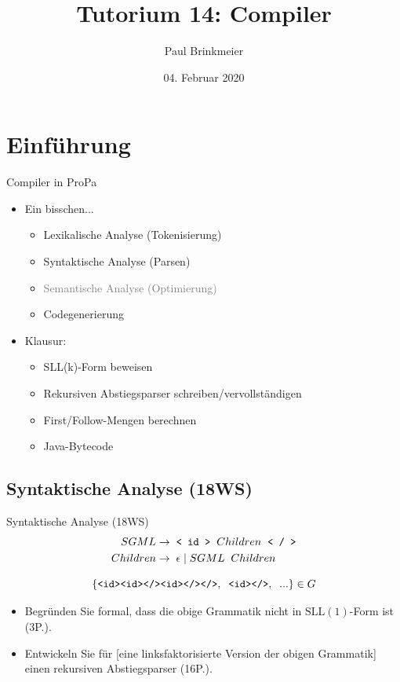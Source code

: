 \documentclass{beamer}
\title{Tutorium 14: Compiler}
\author{Paul Brinkmeier}
\institute{Tutorium Programmierparadigmen am KIT}
\date{04. Februar 2020}
\begin{document}
\begin{frame}
	\titlepage
\end{frame}

\section{Einführung}

\begin{frame}{Compiler in ProPa}
	\begin{itemize}
		\item Ein bisschen...
		\begin{itemize}
			\item Lexikalische Analyse (Tokenisierung)
			\item Syntaktische Analyse (Parsen)
			\item \textcolor{gray}{Semantische Analyse (Optimierung)}
			\item Codegenerierung
		\end{itemize}
		\pause
		\item Klausur:
		\begin{itemize}
			\item SLL(k)-Form beweisen
			\item Rekursiven Abstiegsparser schreiben/vervollständigen
			\item First/Follow-Mengen berechnen
			\item Java-Bytecode
		\end{itemize}
	\end{itemize}
\end{frame}

\subsection{Syntaktische Analyse (18WS)}

\begin{frame}{Syntaktische Analyse (18WS)}
	\begin{align*}
		SGML \to & \;\; \textrm{\texttt{< id >}} \;\; Children \;\; \textrm{\texttt{< / >}}\\
		Children \to & \;\; \epsilon \mid SGML \;\; Children
	\end{align*}

	\begin{equation*}
		\{\textrm{\texttt{<id><id></><id></></>}},\;\;\textrm{\texttt{<id></>}},\;\;...\} \in G
	\end{equation*}

	\pause
	\begin{itemize}
		\item Begründen Sie formal, dass die obige Grammatik nicht in $\textrm{SLL}(1)$-Form ist (3P.).
		\pause
		\item Entwickeln Sie für [eine linksfaktorisierte Version der obigen Grammatik] einen rekursiven Abstiegsparser (16P.).
	\end{itemize}
\end{frame}
\end{document}
